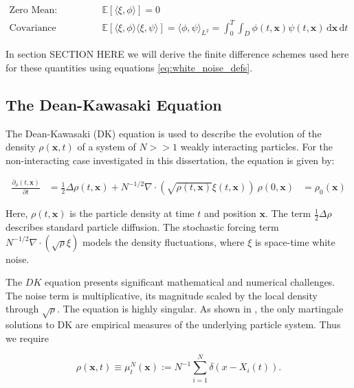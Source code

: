 \begin{align}\label{eq:white_noise_defs}
    \text{Zero Mean: } & \mathbb{E}\left[\langle \xi, \phi \rangle \right] = 0 \\
    \text{Covariance Structure: } & \mathbb{E}\left[\langle\xi,\phi\rangle \langle\xi,\psi\rangle\right]
    = \langle\phi, \psi\rangle_{L^2} = \int_0^T \int_D \phi(t, \mathbf{x}) \psi(t, \mathbf{x}) \,\mathrm{d}\mathbf{x} \,\mathrm{d}t
\end{align}

In section SECTION HERE we will derive the finite difference schemes used here for these 
quantities using equations \eqref{eq:white_noise_defs}.


\subsection{The Dean-Kawasaki Equation}

The Dean-Kawasaki (DK) equation is used to describe the evolution of the density 
$\rho(\mathbf{x}, t)$ of a system of $N >> 1$ weakly interacting particles.
For the non-interacting case investigated in this dissertation, the equation is given by:

\begin{align}\label{eq:dk_spde}
\frac{\partial_\rho(t, \mathbf{x})}{\partial t} &= 
\frac{1}{2}\Delta\rho(t, \mathbf{x}) + N^{-1/2}\nabla\cdot(\sqrt{\rho(t, \mathbf{x})}\xi(t, \mathbf{x})) \tag{DK} \
\rho(0, \mathbf{x}) &= \rho_0(\mathbf{x}) \nonumber
\end{align}

Here, $\rho(t, \mathbf{x})$ is the particle density at time $t$ and position $\mathbf{x}$.
The term $\frac{1}{2} \Delta \rho$ describes standard particle diffusion. 
The stochastic forcing term $N^{-1/2} \nabla \cdot (\sqrt{\rho}\xi)$ models the density 
fluctuations, where $\xi$ is space-time white noise. 

The $DK$ equation presents significant mathematical and numerical challenges. The noise term 
is multiplicative, its magnitude scaled by the local density through $\sqrt{\rho}$.
The equation is highly singular. As shown in \cite{konarovskyi2019dean}, the only 
martingale solutions to DK are empirical measures of the underlying particle system. Thus
we require

\begin{equation*}
    \rho(\mathbf{x},t) \equiv \mu_t^N(\mathbf{x}) := N^{-1} \sum_{i=1}^N\delta(x - X_i(t)).
\end{equation*}

